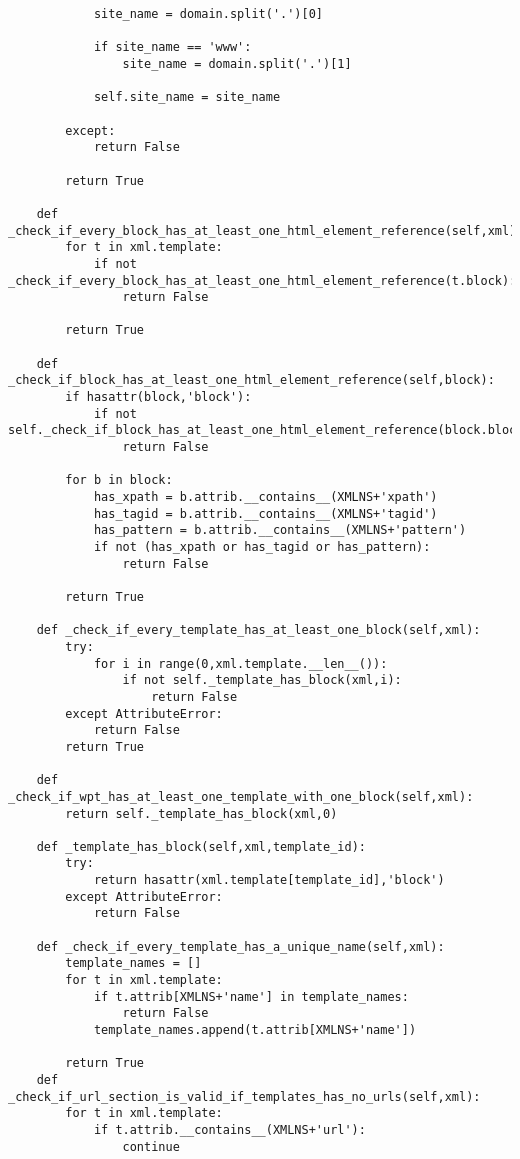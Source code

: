\begin{lstlisting}
            site_name = domain.split('.')[0]
     
            if site_name == 'www':
                site_name = domain.split('.')[1]

            self.site_name = site_name

        except:
            return False
    
        return True

    def _check_if_every_block_has_at_least_one_html_element_reference(self,xml):
        for t in xml.template:
            if not _check_if_every_block_has_at_least_one_html_element_reference(t.block):
                return False

        return True
   
    def _check_if_block_has_at_least_one_html_element_reference(self,block):
        if hasattr(block,'block'): 
            if not self._check_if_block_has_at_least_one_html_element_reference(block.block):
                return False

        for b in block:
            has_xpath = b.attrib.__contains__(XMLNS+'xpath')
            has_tagid = b.attrib.__contains__(XMLNS+'tagid')
            has_pattern = b.attrib.__contains__(XMLNS+'pattern')
            if not (has_xpath or has_tagid or has_pattern):
                return False

        return True
 
    def _check_if_every_template_has_at_least_one_block(self,xml):
        try:
            for i in range(0,xml.template.__len__()):
                if not self._template_has_block(xml,i):
                    return False
        except AttributeError:
            return False
        return True

    def _check_if_wpt_has_at_least_one_template_with_one_block(self,xml):
        return self._template_has_block(xml,0)

    def _template_has_block(self,xml,template_id):
        try:
            return hasattr(xml.template[template_id],'block')
        except AttributeError:
            return False
   
    def _check_if_every_template_has_a_unique_name(self,xml):
        template_names = []
        for t in xml.template:
            if t.attrib[XMLNS+'name'] in template_names:
                return False
            template_names.append(t.attrib[XMLNS+'name'])

        return True
    def _check_if_url_section_is_valid_if_templates_has_no_urls(self,xml):
        for t in xml.template:
            if t.attrib.__contains__(XMLNS+'url'):
                continue


\end{lstlisting}
